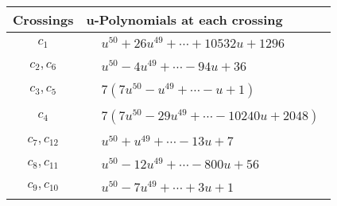 \documentclass[1p]{elsarticle_modified}
\theoremstyle{definition}
\begin{document}
\begin{tabular}{m{50pt}|m{274pt}}
Crossings & \hspace{64pt}u-Polynomials at each crossing \\
\hline $$\begin{aligned}c_{1}\end{aligned}$$&$\begin{aligned}
&u^{50}+26 u^{49}+\cdots+10532 u+1296
\end{aligned}$\\
\hline $$\begin{aligned}c_{2},c_{6}\end{aligned}$$&$\begin{aligned}
&u^{50}-4 u^{49}+\cdots-94 u+36
\end{aligned}$\\
\hline $$\begin{aligned}c_{3},c_{5}\end{aligned}$$&$\begin{aligned}
&7(7 u^{50}- u^{49}+\cdots- u+1)
\end{aligned}$\\
\hline $$\begin{aligned}c_{4}\end{aligned}$$&$\begin{aligned}
&7(7 u^{50}-29 u^{49}+\cdots-10240 u+2048)
\end{aligned}$\\
\hline $$\begin{aligned}c_{7},c_{12}\end{aligned}$$&$\begin{aligned}
&u^{50}+u^{49}+\cdots-13 u+7
\end{aligned}$\\
\hline $$\begin{aligned}c_{8},c_{11}\end{aligned}$$&$\begin{aligned}
&u^{50}-12 u^{49}+\cdots-800 u+56
\end{aligned}$\\
\hline $$\begin{aligned}c_{9},c_{10}\end{aligned}$$&$\begin{aligned}
&u^{50}-7 u^{49}+\cdots+3 u+1
\end{aligned}$\\
\hline
\end{tabular}\\~\\
\newpage\renewcommand{\arraystretch}{1}
\end{document}
